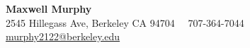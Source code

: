 \centering
    {\large \textbf{Maxwell Murphy}} \\
    {\small 2545 Hillegass Ave, Berkeley CA 94704 \, \textbullet \, 707-364-7044 \, \textbullet \, \href{mailto:murphy2122@berkeley.edu}{murphy2122@berkeley.edu}}

\justifying